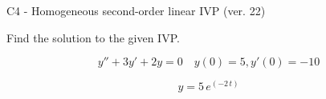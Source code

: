 \begin{exercise}
  \begin{exerciseTitle}C4 - Homogeneous second-order linear IVP (ver. 22)\end{exerciseTitle}
  \begin{exerciseStatement}
    
Find the solution to the given IVP.

    
\[y''+3y'+2y = 0 \hspace{1em} y(0) = 5 , y'(0) = -10\]

  \end{exerciseStatement}
  \begin{exerciseAnswer}
    
\[y= 5 \, e^{\left(-2 \, t\right)}\]

  \end{exerciseAnswer}
\end{exercise}